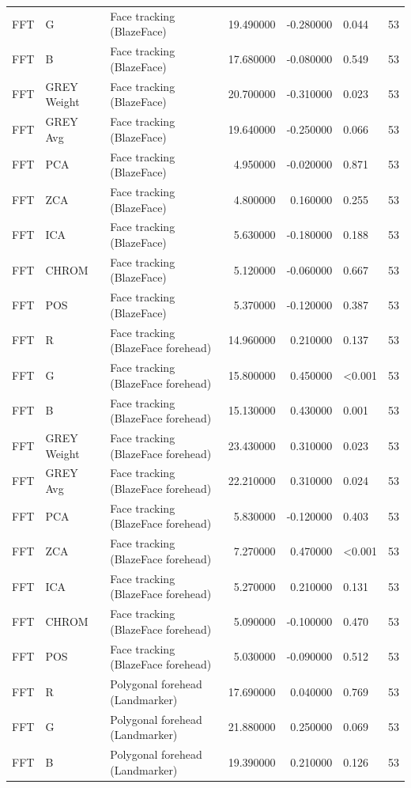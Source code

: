 \begin{table}[htbp]
\begin{tabular}{l l l r r l r}
FFT & G & Face tracking (BlazeFace) & 19.490000 & -0.280000 & 0.044 & 53 \\
FFT & B & Face tracking (BlazeFace) & 17.680000 & -0.080000 & 0.549 & 53 \\
FFT & GREY Weight & Face tracking (BlazeFace) & 20.700000 & -0.310000 & 0.023 & 53 \\
FFT & GREY Avg & Face tracking (BlazeFace) & 19.640000 & -0.250000 & 0.066 & 53 \\
FFT & PCA & Face tracking (BlazeFace) & 4.950000 & -0.020000 & 0.871 & 53 \\
FFT & ZCA & Face tracking (BlazeFace) & 4.800000 & 0.160000 & 0.255 & 53 \\
FFT & ICA & Face tracking (BlazeFace) & 5.630000 & -0.180000 & 0.188 & 53 \\
FFT & CHROM & Face tracking (BlazeFace) & 5.120000 & -0.060000 & 0.667 & 53 \\
FFT & POS & Face tracking (BlazeFace) & 5.370000 & -0.120000 & 0.387 & 53 \\
FFT & R & Face tracking (BlazeFace forehead) & 14.960000 & 0.210000 & 0.137 & 53 \\
FFT & G & Face tracking (BlazeFace forehead) & 15.800000 & 0.450000 & <0.001 & 53 \\
FFT & B & Face tracking (BlazeFace forehead) & 15.130000 & 0.430000 & 0.001 & 53 \\
FFT & GREY Weight & Face tracking (BlazeFace forehead) & 23.430000 & 0.310000 & 0.023 & 53 \\
FFT & GREY Avg & Face tracking (BlazeFace forehead) & 22.210000 & 0.310000 & 0.024 & 53 \\
FFT & PCA & Face tracking (BlazeFace forehead) & 5.830000 & -0.120000 & 0.403 & 53 \\
FFT & ZCA & Face tracking (BlazeFace forehead) & 7.270000 & 0.470000 & <0.001 & 53 \\
FFT & ICA & Face tracking (BlazeFace forehead) & 5.270000 & 0.210000 & 0.131 & 53 \\
FFT & CHROM & Face tracking (BlazeFace forehead) & 5.090000 & -0.100000 & 0.470 & 53 \\
FFT & POS & Face tracking (BlazeFace forehead) & 5.030000 & -0.090000 & 0.512 & 53 \\
FFT & R & Polygonal forehead (Landmarker) & 17.690000 & 0.040000 & 0.769 & 53 \\
FFT & G & Polygonal forehead (Landmarker) & 21.880000 & 0.250000 & 0.069 & 53 \\
FFT & B & Polygonal forehead (Landmarker) & 19.390000 & 0.210000 & 0.126 & 53 \\

\end{tabular}
\end{table}
